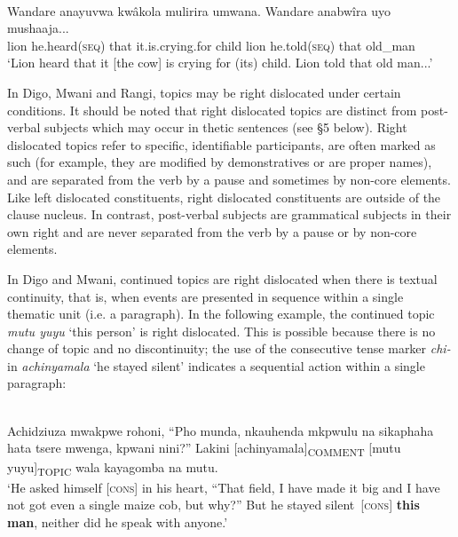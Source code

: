 \documentclass[output=paper]{langsci/langscibook}
\begin{document}
\ea\label{ex:}
\\
\gll Wandare anayuvwa kwâkola mulirira umwana. Wandare anabwîra uyo mushaaja...\\
lion he.heard(\textsc{seq}) that it.is.crying.for child lion he.told(\textsc{seq}) that old\_man  \\


\glt \textup{‘}\textup{Lion heard that it [the cow] is crying for (its) child. Lion told that old man...’}
\z

In Digo, Mwani and Rangi, topics may be right dislocated under certain conditions. It should be noted that right dislocated topics are distinct from post-verbal subjects which may occur in thetic sentences (see §5 below). Right dislocated topics refer to specific, identifiable participants, are often marked as such (for example, they are modified by demonstratives or are proper names), and are separated from the verb by a pause and sometimes by non-core elements. Like left dislocated constituents, right dislocated constituents are outside of the clause nucleus. In contrast, post-verbal subjects are grammatical subjects in their own right and are never separated from the verb by a pause or by non-core elements.

In Digo and Mwani, continued topics are right dislocated when there is textual continuity, that is, when events are presented in sequence within a single thematic unit (i.e. a paragraph). In the following example, the continued topic \textit{mutu yuyu} ‘this person’ is right dislocated. This is possible because there is no change of topic and no discontinuity; the use of the consecutive tense marker \textit{chi}\textit{\nobreakdash-} in \textit{a}\textit{chi}\textit{nyamala} ‘he stayed silent’ indicates a sequential action within a single paragraph:

\ea\label{ex:}
\\
Achidziuza mwakpwe rohoni, “Pho munda, nkauhenda mkpwulu na sikaphaha hata tsere mwenga, kpwani nini?” Lakini [achinyamala]\textsubscript{COMMENT} [mutu yuyu]\textsubscript{TOPIC} wala kayagomba na mutu.\\
\glt \textup{‘}\textup{He}\textup{ asked himself [}\textsc{cons}\textup{] in his heart, “That field, I have made it big and I have not got even a single maize cob, but why?” But }\textup{he stayed silent}\textup{~[}\textsc{cons}\textup{] }\textbf{\textup{this man}}\textup{, neither did he speak with anyone.’}
\z
\end{document}
